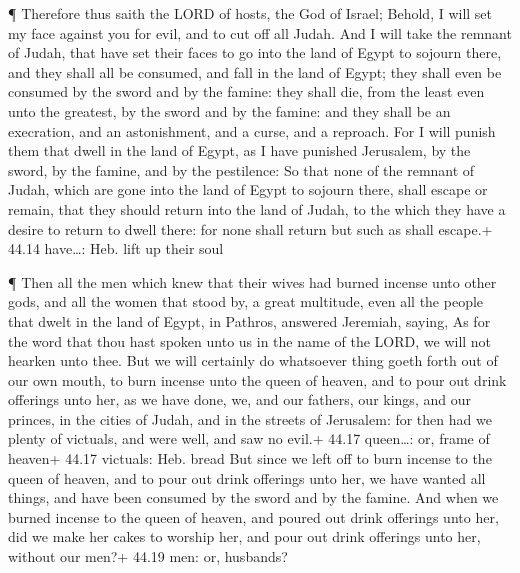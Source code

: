  ¶ Therefore thus saith the LORD of hosts, the God of
Israel; Behold, I will set my face against you for evil, and to cut off
all Judah.  And I will take the remnant of Judah, that have
set their faces to go into the land of Egypt to sojourn there, and they
shall all be consumed, and fall in the land of Egypt; they shall even be
consumed by the sword and by the famine: they shall die, from the least
even unto the greatest, by the sword and by the famine: and they shall
be an execration, and an astonishment, and a curse, and a reproach.
 For I will punish them that dwell in the land of Egypt, as
I have punished Jerusalem, by the sword, by the famine, and by the
pestilence:  So that none of the remnant of Judah, which
are gone into the land of Egypt to sojourn there, shall escape or
remain, that they should return into the land of Judah, to the which
they have a desire to return to dwell there: for none shall return but
such as shall escape.+ 44.14 have\ldots: Heb. lift up their soul

 ¶ Then all the men which knew that their wives had burned
incense unto other gods, and all the women that stood by, a great
multitude, even all the people that dwelt in the land of Egypt, in
Pathros, answered Jeremiah, saying,  As for the word that
thou hast spoken unto us in the name of the LORD, we will not hearken
unto thee.  But we will certainly do whatsoever thing goeth
forth out of our own mouth, to burn incense unto the queen of heaven,
and to pour out drink offerings unto her, as we have done, we, and our
fathers, our kings, and our princes, in the cities of Judah, and in the
streets of Jerusalem: for then had we plenty of victuals, and were well,
and saw no evil.+ 44.17 queen\ldots: or, frame of heaven+ 44.17
victuals: Heb. bread  But since we left off to burn incense
to the queen of heaven, and to pour out drink offerings unto her, we
have wanted all things, and have been consumed by the sword and by the
famine.  And when we burned incense to the queen of heaven,
and poured out drink offerings unto her, did we make her cakes to
worship her, and pour out drink offerings unto her, without our men?+
44.19 men: or, husbands?

